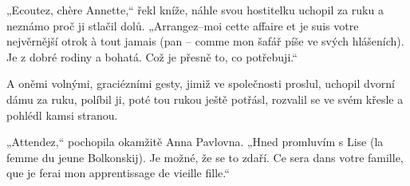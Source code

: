 „Ecoutez, chère Annette,“ řekl kníže, náhle svou hostitelku uchopil za ruku a neznámo proč ji stlačil dolů. „Arrangez–moi cette affaire et je suis votre nejvěrnější otrok à tout jamais (pan – comme mon šafář píše ve svých hlášeních). Je z dobré rodiny a bohatá. Což je přesně to, co potřebuji.“

A oněmi volnými, graciézními gesty, jimiž ve společnosti proslul, uchopil dvorní dámu za ruku, políbil ji, poté tou rukou ještě potřásl, rozvalil se ve svém křesle a pohlédl kamsi stranou.

„Attendez,“ pochopila okamžitě Anna Pavlovna. „Hned promluvím s Lise (la femme du jeune Bolkonskij). Je možné, že se to zdaří. Ce sera dans votre famille, que je ferai mon apprentissage de vieille fille.“

